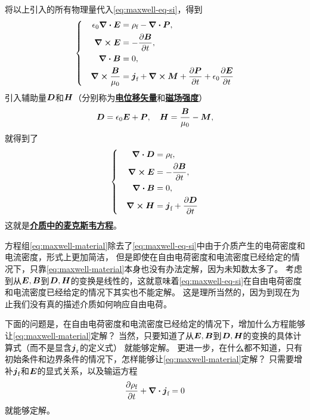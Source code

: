 \documentclass[UTF8, a4paper]{ctexart}
\newcommand*{\concept}[1]{\underline{\textbf{#1}}}
\newenvironment{bigcase}{\left\{\quad\begin{aligned}}{\end{aligned}\right.}
\begin{document}
将以上引入的所有物理量代入\eqref{eq:maxwell-eq-si}，得到
\[
    \begin{bigcase}
        \epsilon_0 \div{\vb*{E}} &= \rho_\text{f} - \div{\vb*{P}}, \\
        \curl{\vb*{E}} &= - \pdv{\vb*{B}}{t}, \\
        \div{\vb*{B}} &= 0, \\
        \curl{\frac{\vb*{B}}{\mu_0}} &= \vb*{j}_\text{f} + \curl{\vb*{M}} + \pdv{\vb*{P}}{t} + \epsilon_0 \pdv{\vb*{E}}{t}
    \end{bigcase}
\]
引入辅助量$\vb*{D}$和$\vb*{H}$（分别称为\concept{电位移矢量}和\concept{磁场强度}）
\begin{equation}
    \vb*{D} = \epsilon_0 \vb*{E} + \vb*{P}, \quad \vb*{H} = \frac{\vb*{B}}{\mu_0} - \vb*{M},
\end{equation}
就得到了
\begin{equation}
    \begin{bigcase}
        \div{\vb*{D}} &= \rho_\text{f}, \\
        \curl{\vb*{E}} &= - \pdv{\vb*{B}}{t}, \\
        \div{\vb*{B}} &= 0, \\
        \curl{\vb*{H}} &= \vb*{j}_\text{f} + \pdv{\vb*{D}}{t}
    \end{bigcase}
    \label{eq:maxwell-material}
\end{equation}
这就是\concept{介质中的麦克斯韦方程}。

方程组\eqref{eq:maxwell-material}除去了\eqref{eq:maxwell-eq-si}中由于介质产生的电荷密度和电流密度，形式上更加简洁，
但是即使在自由电荷密度和电流密度已经给定的情况下，只靠\eqref{eq:maxwell-material}本身也没有办法定解，因为未知数太多了。
考虑到从$\vb*{E}, \vb*{B}$到$\vb*{D}, \vb*{H}$的变换是线性的，这就意味着\eqref{eq:maxwell-eq-si}在自由电荷密度和电流密度已经给定的情况下其实也不能定解。
这是理所当然的，因为到现在为止我们没有真的描述介质如何响应自由电荷。

下面的问题是，在自由电荷密度和电流密度已经给定的情况下，增加什么方程能够让\eqref{eq:maxwell-material}定解？
当然，只要知道了从$\vb*{E}, \vb*{B}$到$\vb*{D}, \vb*{H}$的变换的具体计算式（而不是显含$\vb*{j}_\text{r}$的定义式）
就能够定解。
更进一步，在什么都不知道，只有初始条件和边界条件的情况下，怎样能够让\eqref{eq:maxwell-material}定解？
只需要增补$\vb*{j}_\text{f}$和$\vb*{E}$的显式关系，以及输运方程
\begin{equation}
    \pdv{\rho_\text{f}}{t} + \div{\vb*{j}_\text{f}} = 0
    \label{eq:transportation}
\end{equation}
就能够定解。
\end{document}
